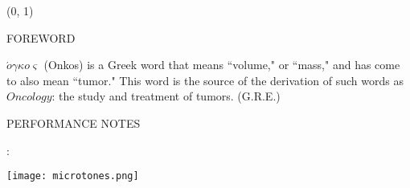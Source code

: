 \documentclass[11pt]{article}
\begin{document}
\begin{textblock}{23}(0, 1)
\begin{center}
\huge FOREWORD
\end{center}
\end{textblock}

\vspace*{0.25\baselineskip}

\begingroup
\begin{center}
\hspace{10mm} $\acute{o} \gamma \kappa o \varsigma$ (Onkos) is a Greek word that means ``volume," or ``mass," and has come to also mean ``tumor." This word is the source of the derivation of such words as $Oncology$: the study and treatment of tumors.
\rightskip\leftskip
\phantom{text} \hfill (G.R.E.)
\end{center}
\endgroup 

\begin{center}
\huge PERFORMANCE NOTES
\end{center}

\begin{center}
:
\end{center}

\begin{center}
\texttt{[image: microtones.png]}
\end{center}
\end{document}
